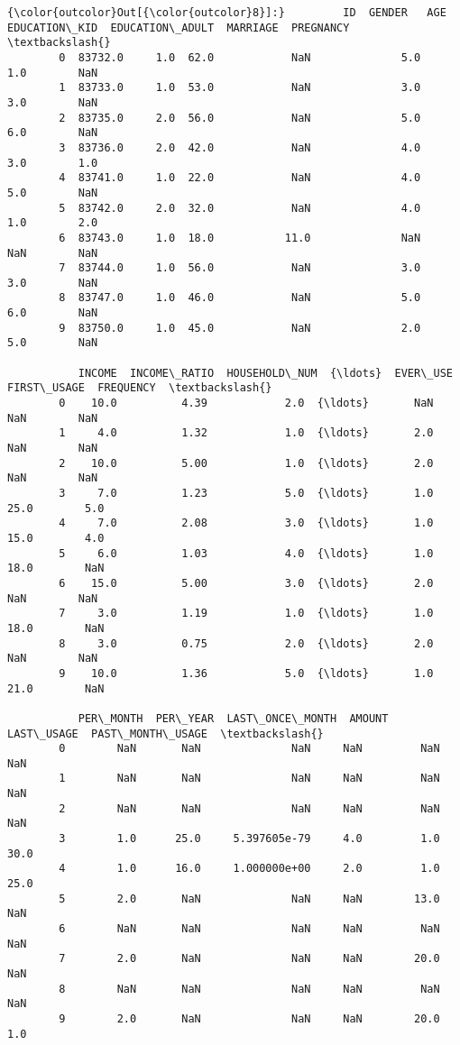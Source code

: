 \documentclass[11pt]{article}
\begin{document}
\begin{Verbatim}[commandchars=\\\{\}]
{\color{outcolor}Out[{\color{outcolor}8}]:}         ID  GENDER   AGE  EDUCATION\_KID  EDUCATION\_ADULT  MARRIAGE  PREGNANCY  \textbackslash{}
        0  83732.0     1.0  62.0            NaN              5.0       1.0        NaN   
        1  83733.0     1.0  53.0            NaN              3.0       3.0        NaN   
        2  83735.0     2.0  56.0            NaN              5.0       6.0        NaN   
        3  83736.0     2.0  42.0            NaN              4.0       3.0        1.0   
        4  83741.0     1.0  22.0            NaN              4.0       5.0        NaN   
        5  83742.0     2.0  32.0            NaN              4.0       1.0        2.0   
        6  83743.0     1.0  18.0           11.0              NaN       NaN        NaN   
        7  83744.0     1.0  56.0            NaN              3.0       3.0        NaN   
        8  83747.0     1.0  46.0            NaN              5.0       6.0        NaN   
        9  83750.0     1.0  45.0            NaN              2.0       5.0        NaN   
        
           INCOME  INCOME\_RATIO  HOUSEHOLD\_NUM  {\ldots}  EVER\_USE  FIRST\_USAGE  FREQUENCY  \textbackslash{}
        0    10.0          4.39            2.0  {\ldots}       NaN          NaN        NaN   
        1     4.0          1.32            1.0  {\ldots}       2.0          NaN        NaN   
        2    10.0          5.00            1.0  {\ldots}       2.0          NaN        NaN   
        3     7.0          1.23            5.0  {\ldots}       1.0         25.0        5.0   
        4     7.0          2.08            3.0  {\ldots}       1.0         15.0        4.0   
        5     6.0          1.03            4.0  {\ldots}       1.0         18.0        NaN   
        6    15.0          5.00            3.0  {\ldots}       2.0          NaN        NaN   
        7     3.0          1.19            1.0  {\ldots}       1.0         18.0        NaN   
        8     3.0          0.75            2.0  {\ldots}       2.0          NaN        NaN   
        9    10.0          1.36            5.0  {\ldots}       1.0         21.0        NaN   
        
           PER\_MONTH  PER\_YEAR  LAST\_ONCE\_MONTH  AMOUNT  LAST\_USAGE  PAST\_MONTH\_USAGE  \textbackslash{}
        0        NaN       NaN              NaN     NaN         NaN               NaN   
        1        NaN       NaN              NaN     NaN         NaN               NaN   
        2        NaN       NaN              NaN     NaN         NaN               NaN   
        3        1.0      25.0     5.397605e-79     4.0         1.0              30.0   
        4        1.0      16.0     1.000000e+00     2.0         1.0              25.0   
        5        2.0       NaN              NaN     NaN        13.0               NaN   
        6        NaN       NaN              NaN     NaN         NaN               NaN   
        7        2.0       NaN              NaN     NaN        20.0               NaN   
        8        NaN       NaN              NaN     NaN         NaN               NaN   
        9        2.0       NaN              NaN     NaN        20.0               1.0   
        

\end{Verbatim}
\end{document}
